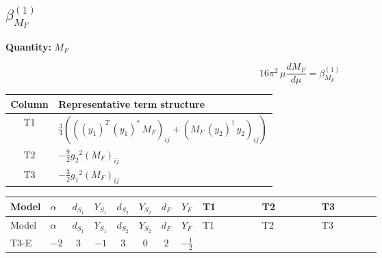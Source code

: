 \documentclass[8pt]{article}
\begin{document}
\begin{landscape}
\section*{$\beta_{M_F}^{(1)}$}
\noindent\textbf{Quantity: }$M_F$\par\smallskip
\[16\pi^2\,\mu\frac{d M_F}{d\mu}=\beta_{M_F}^{(1)}\]
\begin{center}
\begin{tabular}{@{}c >{\raggedright\arraybackslash}p{0.82\linewidth}@{}}
\toprule
Column & Representative term structure \\
\midrule
T1 & \(\displaystyle \frac{3}{4} (\left(\left({y_1}\right)^{T}\,\left({y_1}\right)^{*}\,{M_F}\right)_{ij}+\left({M_F}\,\left({y_2}\right)^{\dagger}\,{y_2}\right)_{ij})\) \\
\midrule
T2 & \(\displaystyle -\frac{9}{2} {g_2}^2 \left({M_F}\right)_{ij}\) \\
\midrule
T3 & \(\displaystyle -\frac{3}{2} {g_1}^2 \left({M_F}\right)_{ij}\) \\
\midrule
\bottomrule
\end{tabular}
\end{center}
\smallskip
\tiny
\begin{longtable}{@{}llcccccc >{\raggedright\arraybackslash}p{0.21\linewidth} >{\raggedright\arraybackslash}p{0.21\linewidth} >{\raggedright\arraybackslash}p{0.21\linewidth}@{}}
\toprule
Model & $\alpha$ & $d_{S_1}$ & $Y_{S_1}$ & $d_{S_2}$ & $Y_{S_2}$ & $d_F$ & $Y_F$ & T1 & T2 & T3 \\
\midrule
\endfirsthead
\toprule
Model & $\alpha$ & $d_{S_1}$ & $Y_{S_1}$ & $d_{S_2}$ & $Y_{S_2}$ & $d_F$ & $Y_F$ & T1 & T2 & T3 \\
\midrule
\endhead
T3-E & $-2$ & $3$ & $-1$ & $3$ & $0$ & $2$ & $-\frac{1}{2}$ & \scriptsize\adjustbox{max width=\linewidth}{$\begin{gathered} \frac{3}{4} (\left(\left({y_1}\right)^{T}\,\left({y_1}\right)^{*}\,{M_F}\right)_{ij}+\left({M_F}\,\left({y_2}\right)^{\dagger}\,{y_2}\right)_{ij})\end{gathered}$} & \scriptsize\adjustbox{max width=\linewidth}{$\begin{gathered} -\frac{9}{2} {g_2}^2 \left({M_F}\right)_{ij}\end{gathered}$} & \scriptsize\adjustbox{max width=\linewidth}{$\begin{gathered} -\frac{3}{2} {g_1}^2 \left({M_F}\right)_{ij}\end{gathered}$} \\
\midrule
\bottomrule
\end{longtable}
\clearpage

\end{landscape}
\end{document}
